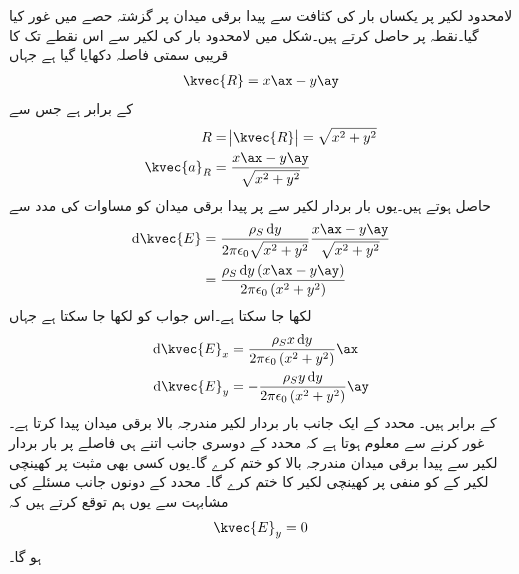 لامحدود لکیر پر یکساں بار کی کثافت سے پیدا برقی میدان پر گزشتہ حصے میں غور کیا گیا۔نقطہ   پر  حاصل کرتے ہیں۔شکل میں لامحدود بار کی لکیر سے اس نقطے تک کا قریبی سمتی فاصلہ  دکھایا گیا ہے جہاں
\begin{align}
\kvec{R}=x \ax-y\ay
\end{align}
کے برابر ہے جس سے
\begin{gather}
\begin{aligned}
R&=\abs{\kvec{R}}=\sqrt{x^2+y^2}\\
\kvec{a}_R&=\frac{x\ax-y\ay}{\sqrt{x^2+y^2}}
\end{aligned}
\end{gather}
حاصل ہوتے ہیں۔یوں بار بردار لکیر سے  پر پیدا برقی میدان کو مساوات   کی مدد سے
\begin{gather}
\begin{aligned}
\dif \kvec{E} &= \frac{\rho_S \dif y}{2 \pi \epsilon_0 \sqrt{x^2+y^2}} \frac{x\ax-y\ay}{\sqrt{x^2+y^2}}\\
&=\frac{\rho_S \dif y \left(x\ax-y\ay \right)}{2 \pi \epsilon_0 \left(x^2+y^2\right)}
\end{aligned}
\end{gather}
لکھا جا سکتا ہے۔اس جواب کو  لکھا جا سکتا ہے جہاں
\begin{gather}\label{مساوات_کولمب_لامحدود_سطح_کی_میدان_کے_اجزاء}
\begin{aligned}
\dif \kvec{E}_x&=\frac{\rho_S x \dif y }{2 \pi \epsilon_0 \left(x^2+y^2\right)}\ax\\
\dif \kvec{E}_y&=-\frac{\rho_S y\dif y }{2 \pi \epsilon_0 \left(x^2+y^2\right)} \ay
\end{aligned}
\end{gather}
کے برابر ہیں۔ محدد کے ایک جانب بار بردار لکیر مندرجہ بالا برقی میدان پیدا کرتا ہے۔غور کرنے سے معلوم ہوتا ہے کہ  محدد کے دوسری جانب اتنے ہی فاصلے پر بار بردار لکیر سے پیدا برقی میدان مندرجہ بالا  کو ختم کرے گا۔یوں کسی بھی مثبت  پر کھینچی لکیر کے   کو منفی  پر کھینچی لکیر کا  ختم کرے گا۔ محدد کے دونوں جانب مسئلے کی مشابہت سے یوں ہم توقع کرتے ہیں کہ
\begin{align}\label{مساوات_کولمب_سطحی_صفر_شدت_حصہ}
\kvec{E}_y=0
\end{align} 
ہو گا۔

